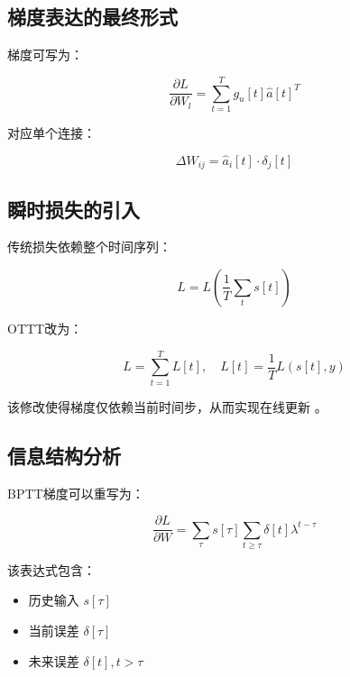 \documentclass[journal,12pt,onecolumn]{IEEEtran}
\begin{document}
\subsection{梯度表达的最终形式}

梯度可写为：

\begin{equation}
\frac{\partial L}{\partial W_l}
=
\sum_{t=1}^{T}
g_u[t] \hat{a}[t]^T
\end{equation}

对应单个连接：

\begin{equation}
\Delta W_{ij} = \hat{a}_i[t] \cdot \delta_j[t]
\end{equation}



\subsection{瞬时损失的引入}

传统损失依赖整个时间序列：

\begin{equation}
L = L\left(\frac{1}{T} \sum_{t} s[t]\right)
\end{equation}

OTTT改为：

\begin{equation}
L = \sum_{t=1}^{T} L[t], \quad L[t] = \frac{1}{T} L(s[t], y)
\end{equation}

该修改使得梯度仅依赖当前时间步，从而实现在线更新 \cite{xiao2022online}。



\subsection{信息结构分析}

BPTT梯度可以重写为：

\begin{equation}
\frac{\partial L}{\partial W}
=
\sum_{\tau}
s[\tau]
\sum_{t \ge \tau}
\delta[t]\lambda^{t-\tau}
\end{equation}

该表达式包含：

\begin{itemize}
\item 历史输入 $s[\tau]$
\item 当前误差 $\delta[\tau]$
\item 未来误差 $\delta[t], t>\tau$
\end{itemize}
\end{document}
